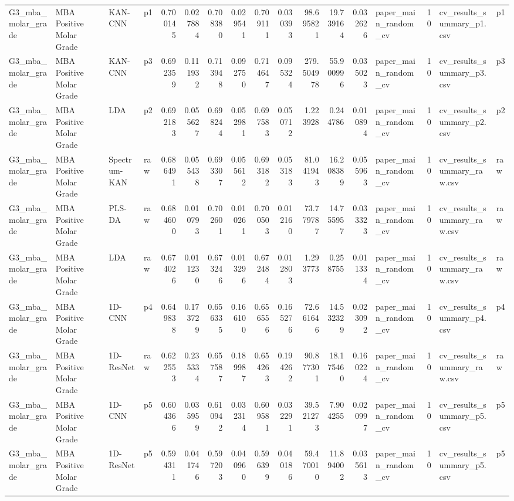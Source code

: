 \begin{tabular}{llllrrrrrrrrrlrll}
G3_mba_molar_grade & MBA Positive Molar Grade & KAN-CNN & p1 & 0.700145 & 0.027884 & 0.708380 & 0.029541 & 0.709111 & 0.030393 & 98.695821 & 19.739164 & 0.032626 & paper_main_random_cv & 10 & cv_results_summary_p1.csv & p1 \\
G3_mba_molar_grade & MBA Positive Molar Grade & KAN-CNN & p3 & 0.692359 & 0.111932 & 0.713948 & 0.092750 & 0.714647 & 0.095324 & 279.504978 & 55.900996 & 0.035023 & paper_main_random_cv & 10 & cv_results_summary_p3.csv & p3 \\
G3_mba_molar_grade & MBA Positive Molar Grade & LDA & p2 & 0.692183 & 0.055627 & 0.698244 & 0.052981 & 0.697583 & 0.050712 & 1.223928 & 0.244786 & 0.010894 & paper_main_random_cv & 10 & cv_results_summary_p2.csv & p2 \\
G3_mba_molar_grade & MBA Positive Molar Grade & Spectrum-KAN & raw & 0.686491 & 0.055438 & 0.693307 & 0.055612 & 0.693182 & 0.053183 & 81.041943 & 16.208389 & 0.055963 & paper_main_random_cv & 10 & cv_results_summary_raw.csv & raw \\
G3_mba_molar_grade & MBA Positive Molar Grade & PLS-DA & raw & 0.684600 & 0.010793 & 0.702601 & 0.010261 & 0.700503 & 0.012160 & 73.779787 & 14.755957 & 0.033323 & paper_main_random_cv & 10 & cv_results_summary_raw.csv & raw \\
G3_mba_molar_grade & MBA Positive Molar Grade & LDA & raw & 0.674026 & 0.011230 & 0.673246 & 0.013296 & 0.672484 & 0.012803 & 1.293773 & 0.258755 & 0.011334 & paper_main_random_cv & 10 & cv_results_summary_raw.csv & raw \\
G3_mba_molar_grade & MBA Positive Molar Grade & 1D-CNN & p4 & 0.649838 & 0.173729 & 0.656335 & 0.166100 & 0.656556 & 0.165276 & 72.661646 & 14.532329 & 0.023092 & paper_main_random_cv & 10 & cv_results_summary_p4.csv & p4 \\
G3_mba_molar_grade & MBA Positive Molar Grade & 1D-ResNet & raw & 0.622553 & 0.235334 & 0.657587 & 0.189987 & 0.654263 & 0.194262 & 90.877301 & 18.175460 & 0.160224 & paper_main_random_cv & 10 & cv_results_summary_raw.csv & raw \\
G3_mba_molar_grade & MBA Positive Molar Grade & 1D-CNN & p5 & 0.604366 & 0.035959 & 0.610942 & 0.032314 & 0.609581 & 0.032291 & 39.521273 & 7.904255 & 0.020997 & paper_main_random_cv & 10 & cv_results_summary_p5.csv & p5 \\
G3_mba_molar_grade & MBA Positive Molar Grade & 1D-ResNet & p5 & 0.594311 & 0.041746 & 0.597203 & 0.040960 & 0.596399 & 0.040186 & 59.470010 & 11.894002 & 0.035613 & paper_main_random_cv & 10 & cv_results_summary_p5.csv & p5 \\

\end{tabular}
